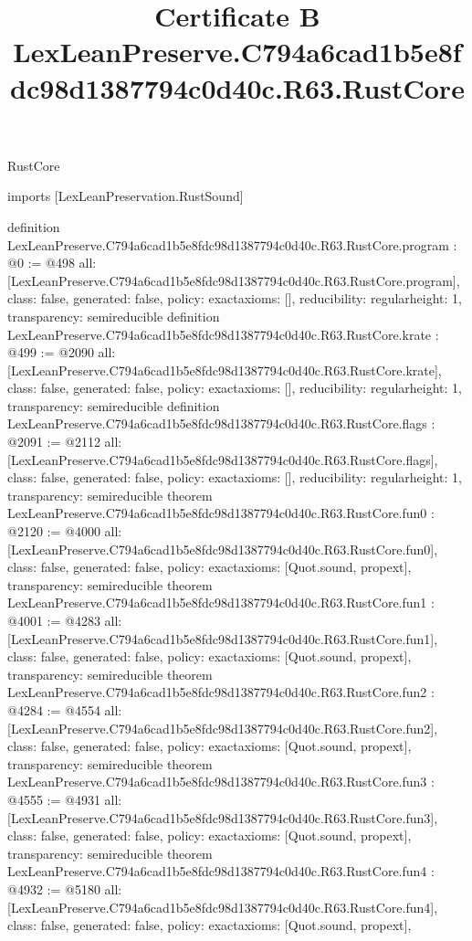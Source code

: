 \begin{lexlean}{RustCore}
\title{Certificate B LexLeanPreserve.C794a6cad1b5e8fdc98d1387794c0d40c.R63.RustCore}
\begin{coremodule}
imports [LexLeanPreservation.RustSound]

definition LexLeanPreserve.C794a6cad1b5e8fdc98d1387794c0d40c.R63.RustCore.program : @0 := @498 {
  all: [LexLeanPreserve.C794a6cad1b5e8fdc98d1387794c0d40c.R63.RustCore.program],
  class: false,
  generated: false,
  policy: exact{axioms: []},
  reducibility: regular{height: 1},
  transparency: semireducible
}
definition LexLeanPreserve.C794a6cad1b5e8fdc98d1387794c0d40c.R63.RustCore.krate : @499 := @2090 {
  all: [LexLeanPreserve.C794a6cad1b5e8fdc98d1387794c0d40c.R63.RustCore.krate],
  class: false,
  generated: false,
  policy: exact{axioms: []},
  reducibility: regular{height: 1},
  transparency: semireducible
}
definition LexLeanPreserve.C794a6cad1b5e8fdc98d1387794c0d40c.R63.RustCore.flags : @2091 := @2112 {
  all: [LexLeanPreserve.C794a6cad1b5e8fdc98d1387794c0d40c.R63.RustCore.flags],
  class: false,
  generated: false,
  policy: exact{axioms: []},
  reducibility: regular{height: 1},
  transparency: semireducible
}
theorem LexLeanPreserve.C794a6cad1b5e8fdc98d1387794c0d40c.R63.RustCore.fun0 : @2120 := @4000 {
  all: [LexLeanPreserve.C794a6cad1b5e8fdc98d1387794c0d40c.R63.RustCore.fun0],
  class: false,
  generated: false,
  policy: exact{axioms: [Quot.sound, propext]},
  transparency: semireducible
}
theorem LexLeanPreserve.C794a6cad1b5e8fdc98d1387794c0d40c.R63.RustCore.fun1 : @4001 := @4283 {
  all: [LexLeanPreserve.C794a6cad1b5e8fdc98d1387794c0d40c.R63.RustCore.fun1],
  class: false,
  generated: false,
  policy: exact{axioms: [Quot.sound, propext]},
  transparency: semireducible
}
theorem LexLeanPreserve.C794a6cad1b5e8fdc98d1387794c0d40c.R63.RustCore.fun2 : @4284 := @4554 {
  all: [LexLeanPreserve.C794a6cad1b5e8fdc98d1387794c0d40c.R63.RustCore.fun2],
  class: false,
  generated: false,
  policy: exact{axioms: [Quot.sound, propext]},
  transparency: semireducible
}
theorem LexLeanPreserve.C794a6cad1b5e8fdc98d1387794c0d40c.R63.RustCore.fun3 : @4555 := @4931 {
  all: [LexLeanPreserve.C794a6cad1b5e8fdc98d1387794c0d40c.R63.RustCore.fun3],
  class: false,
  generated: false,
  policy: exact{axioms: [Quot.sound, propext]},
  transparency: semireducible
}
theorem LexLeanPreserve.C794a6cad1b5e8fdc98d1387794c0d40c.R63.RustCore.fun4 : @4932 := @5180 {
  all: [LexLeanPreserve.C794a6cad1b5e8fdc98d1387794c0d40c.R63.RustCore.fun4],
  class: false,
  generated: false,
  policy: exact{axioms: [Quot.sound, propext]},
}
\end{coremodule}
\end{lexlean}
